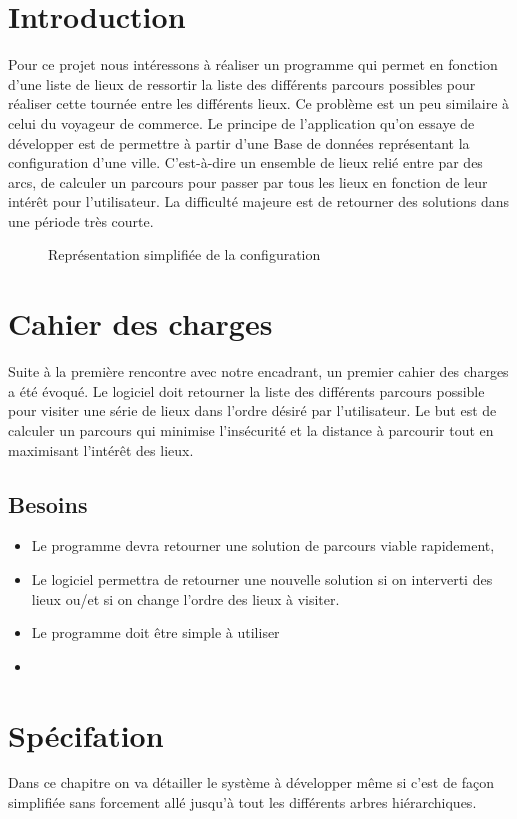 \chapter{Introduction}

Pour ce projet nous intéressons à réaliser un programme qui permet en fonction d'une liste de lieux de ressortir la liste des différents parcours possibles pour réaliser cette tournée entre les différents lieux. Ce problème est un peu similaire à celui du voyageur de commerce. 
Le principe de l'application qu'on essaye de développer est de permettre à partir d'une Base de données représentant la configuration d'une ville.
C'est-à-dire un ensemble de lieux relié entre par des arcs, de calculer un parcours pour passer par tous les lieux en fonction de leur intérêt pour l'utilisateur.
La difficulté majeure est de retourner des solutions dans une  période très courte. 
\begin{figure}[h]
\begin{center}

\caption{Représentation simplifiée de la configuration}
\end{center}
\end{figure}

\chapter{Cahier des charges}

Suite à la première rencontre avec notre encadrant, un premier cahier des charges a été évoqué. Le logiciel doit retourner la liste des différents parcours possible pour visiter une série de lieux dans l'ordre désiré par l'utilisateur. Le but est de calculer un parcours qui minimise l'insécurité et la distance à parcourir tout en maximisant l'intérêt des lieux.
\section{Besoins}
\begin{itemize}
\item Le programme devra retourner une solution de parcours viable rapidement,
\item Le logiciel permettra de retourner une nouvelle solution si on interverti des lieux ou/et si on change l'ordre des lieux à visiter.
\item Le programme doit être simple à utiliser
\item
\end{itemize}

\chapter{Spécifation}
  Dans ce chapitre on va détailler le système à développer même si c'est de façon simplifiée sans forcement allé jusqu'à tout les différents arbres hiérarchiques. 